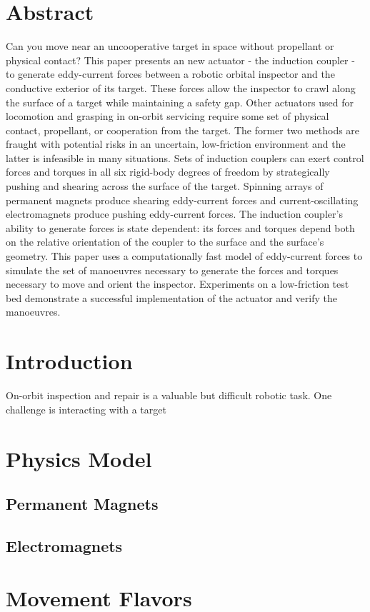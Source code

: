 \documentclass[10pt]{article}
\begin{document}
\section{Abstract}
Can you move near an uncooperative target in space without propellant or physical contact? This paper presents an new actuator - the induction coupler - to generate eddy-current forces between a robotic orbital inspector and the conductive exterior of its target. These forces allow the inspector to crawl along the surface of a target while maintaining a safety gap. Other actuators used for locomotion and grasping in on-orbit servicing require some set of physical contact, propellant, or cooperation from the target. The former two methods are fraught with potential risks in an uncertain, low-friction environment and the latter is infeasible in many situations.  Sets of induction couplers can exert control forces and torques in all six rigid-body degrees of freedom by strategically pushing and shearing across the surface of the target. Spinning arrays of permanent magnets produce shearing eddy-current forces and current-oscillating electromagnets produce pushing eddy-current forces. The induction coupler's ability to generate forces is state dependent: its forces and torques depend both on the relative orientation of the coupler to the surface and the surface's geometry. This paper uses a computationally fast model of eddy-current forces to simulate the set of manoeuvres necessary to generate the forces and torques necessary to move and orient the inspector. Experiments on a low-friction test bed demonstrate a successful implementation of the actuator and verify the manoeuvres.       
\section{Introduction}
On-orbit inspection and repair is a valuable but difficult robotic task. One challenge is interacting with a target  
\section{Physics Model}
\subsection{Permanent Magnets}
\subsection{Electromagnets}
\section{Movement Flavors}
\end{document}
